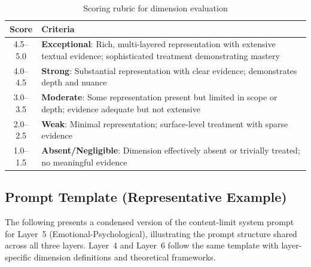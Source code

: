 \begin{table}[h]
\centering
\caption{Scoring rubric for dimension evaluation}
\label{tab:scoring_rubric}
\small
\begin{tabular}{cp{6.5cm}}
\toprule
\textbf{Score} & \textbf{Criteria} \\
\midrule
4.5--5.0 & \textbf{Exceptional}: Rich, multi-layered representation with extensive textual evidence; sophisticated treatment demonstrating mastery \\
4.0--4.5 & \textbf{Strong}: Substantial representation with clear evidence; demonstrates depth and nuance \\
3.0--3.5 & \textbf{Moderate}: Some representation present but limited in scope or depth; evidence adequate but not extensive \\
2.0--2.5 & \textbf{Weak}: Minimal representation; surface-level treatment with sparse evidence \\
1.0--1.5 & \textbf{Absent/Negligible}: Dimension effectively absent or trivially treated; no meaningful evidence \\
\bottomrule
\end{tabular}
\end{table}

\subsection*{Prompt Template (Representative Example)}

The following presents a condensed version of the content-limit system prompt for Layer~5 (Emotional-Psychological), illustrating the prompt structure shared across all three layers. Layer~4 and Layer~6 follow the same template with layer-specific dimension definitions and theoretical frameworks.

